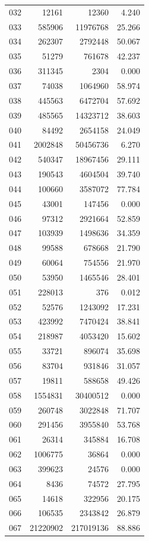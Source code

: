 \documentclass[anonymous,notoc]{gmcm2026}
\begin{document}
\begin{longtable}{lrrr}
032 & 12161 & 12360 & 4.240 \\
033 & 585906 & 11976768 & 25.266 \\
034 & 262307 & 2792448 & 50.067 \\
035 & 51279 & 761678 & 42.237 \\
036 & 311345 & 2304 & 0.000 \\
037 & 74038 & 1064960 & 58.974 \\
038 & 445563 & 6472704 & 57.692 \\
039 & 485565 & 14323712 & 38.603 \\
040 & 84492 & 2654158 & 24.049 \\
041 & 2002848 & 50456736 & 6.270 \\
042 & 540347 & 18967456 & 29.111 \\
043 & 190543 & 4604504 & 39.740 \\
044 & 100660 & 3587072 & 77.784 \\
045 & 43001 & 147456 & 0.000 \\
046 & 97312 & 2921664 & 52.859 \\
047 & 103939 & 1498636 & 34.359 \\
048 & 99588 & 678668 & 21.790 \\
049 & 60064 & 754556 & 21.970 \\
050 & 53950 & 1465546 & 28.401 \\
051 & 228013 & 376 & 0.012 \\
052 & 52576 & 1243092 & 17.231 \\
053 & 423992 & 7470424 & 38.841 \\
054 & 218987 & 4053420 & 15.602 \\
055 & 33721 & 896074 & 35.698 \\
056 & 83704 & 931846 & 31.057 \\
057 & 19811 & 588658 & 49.426 \\
058 & 1554831 & 30400512 & 0.000 \\
059 & 260748 & 3022848 & 71.707 \\
060 & 291456 & 3955840 & 53.768 \\
061 & 26314 & 345884 & 16.708 \\
062 & 1006775 & 36864 & 0.000 \\
063 & 399623 & 24576 & 0.000 \\
064 & 8436 & 74572 & 27.795 \\
065 & 14618 & 322956 & 20.175 \\
066 & 106535 & 2343842 & 26.879 \\
067 & 21220902 & 217019136 & 88.886 \\

\end{longtable}
\end{document}
